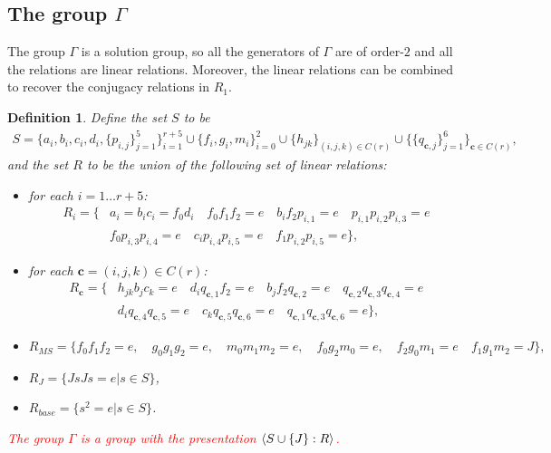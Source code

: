 \documentclass[11pt,letterpaper]{article}
\DeclarePairedDelimiter{\ip}{\langle}{\rangle}
\newcommand{\1}{\mathbb{1}}
\newcommand{\bc}{\pmb{c}}
\newcommand{\hf}[1]{\textcolor{red}{#1}}
\newtheorem{definition}[theorem]{Definition}
\theoremstyle{definition}
\begin{document}
\subsection{The group $\Gamma$}
\label{sec:gamma}
The group $\Gamma$ is a solution group,
so all the generators of $\Gamma$ are of order-$2$
and all the relations are linear relations.
Moreover, the linear relations can be combined
to recover the conjugacy relations in $R_1$.
\begin{definition}
\label{def:gamma}
Define the set $S$ to be 
\begin{align*}
	S = \{a_i, b_i, c_i, d_i,\{ p_{i,j} \}_{j=1}^5\}_{i=1}^{r+5} \cup \{f_i,g_i,m_i\}_{i=0}^2 \cup \{h_{jk}\}_{(i,j,k) \in C(r)} \cup 
	\{\{q_{\bc,j} \}_{j=1}^6\}_{\bc \in C(r)},
\end{align*}
and the set $R$ to be the union of the following
set of linear relations:
\begin{itemize}
\item for each $i = 1 \dots r+5$:
\begin{align*}
	R_i =  \{ &a_i = b_ic_i = f_0d_i\quad
	f_0 f_1 f_2 = e \quad b_i f_2 p_{i,1} = e \quad p_{i,1} p_{i,2} p_{i,3} = e\\
	&f_0 p_{i,3} p_{i,4} = e \quad c_i p_{i,4} p_{i,5} =e \quad f_1 p_{i,2} p_{i,5} = e\},
\end{align*}
\item for each $ \bc = (i,j,k) \in C(r)$:
\begin{align*}
	R_{\bc} = \{&h_{jk}b_j c_k = e \quad
	d_i q_{\bc,1} f_2 = e \quad b_j f_2 q_{\bc,2} = e \quad q_{\bc,2} q_{\bc,3} q_{\bc,4} = e\\
	&d_i q_{\bc,4} q_{\bc,5} = e \quad c_k q_{\bc,5} q_{\bc,6} =e \quad q_{\bc,1} q_{\bc,3} q_{\bc,6} = e\},
\end{align*}
\item 
$
	R_{MS} = \{f_0 f_1 f_2 = e,\quad g_0 g_1 g_2 = e,\quad m_0 m_1 m_2 = e,\quad
	f_0 g_2 m_0 = e, \quad f_2 g_0 m_1 = e \quad f_1 g_1 m_2 = J\},
$
\item $R_J = \{ J s J s = e \vert s \in S\}$,
\item $R_{base} = \{ s^2 = e \vert s \in S\}$.
\end{itemize}
\hf{The group $\Gamma$ is a group with the presentation
$\ip{S \cup \{J\} : R}$.}
\end{definition}
\end{document}
